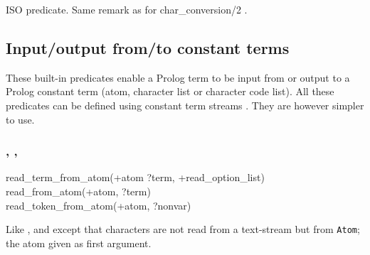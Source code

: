 \begin{PlErrors}



\end{PlErrors}

\Portability

ISO predicate. Same remark as for char\_conversion/2
.

\subsection{Input/output from/to constant terms}
\label{Input/output-from/to-constant-terms}
These built-in predicates enable a Prolog term to be input from or output to
a Prolog constant term (atom, character list or character code list). All
these predicates can be defined using constant term streams
. They are however simpler to use.

\subsubsection{,\label{read-term-from-atom/3}
               ,
               }


\begin{TemplatesOneCol}
read\_term\_from\_atom(+atom ?term, +read\_option\_list)\\
read\_from\_atom(+atom, ?term)\\
read\_token\_from\_atom(+atom, ?nonvar)

\end{TemplatesOneCol}

\Description

\texttt{}%
\texttt{}%
\texttt{}%
Like ,   and
  except that characters are not
read from a text-stream but from \texttt{Atom}; the atom given as first
argument.

\begin{PlErrors}




\end{PlErrors}

